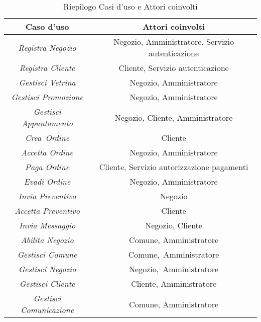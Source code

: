 \begin{table}[!htb]
    \centering
    \begin{tabular}{|c|c|} 
    \hline
    \textbf{Caso d'uso}             & \textbf{Attori coinvolti}                         \\ 
    \hline
    \textit{Registra Negozio}       & Negozio, Amministratore, Servizio autenticazione  \\ 
    \hline
    \textit{Registra Cliente}       & Cliente, Servizio autenticazione                  \\ 
    \hline
    \textit{Gestisci Vetrina}       & Negozio, Amministratore                           \\ 
    \hline
    \textit{Gestisci Promozione}    & Negozio, Amministratore                           \\ 
    \hline
    \textit{Gestisci Appuntamento}  & Negozio, Cliente, Amministratore                  \\ 
    \hline
    \textit{Crea~Ordine}            & Cliente                                           \\ 
    \hline
    \textit{Accetta Ordine}         & Negozio, Amministratore                           \\ 
    \hline
    \textit{Paga Ordine}            & Cliente, Servizio autorizzazione pagamenti        \\ 
    \hline
    \textit{Evadi Ordine}           & Negozio, Amministratore                           \\ 
    \hline
    \textit{Invia Preventivo}       & Negozio                                           \\ 
    \hline
    \textit{Accetta Preventivo}     & Cliente                                           \\ 
    \hline
    \textit{Invia Messaggio}        & Negozio, Cliente                                  \\ 
    \hline
    \textit{Abilita Negozio}        & Comune, Amministratore                            \\ 
    \hline
    \textit{Gestisci Comune}        & Comune,~Amministratore                            \\ 
    \hline
    \textit{Gestisci Negozio}       & Negozio,~Amministratore                           \\ 
    \hline
    \textit{Gestisci Cliente}       & Cliente, Amministratore                           \\ 
    \hline
    \textit{Gestisci Comunicazione} & Comune, Amministratore                            \\
    \hline
    \end{tabular}
    \caption{Riepilogo Casi d'uso e Attori coinvolti}
\end{table}

